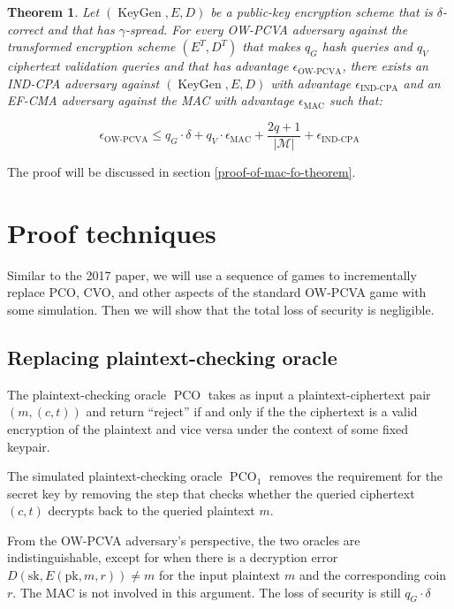 \documentclass{article}
\newcommand{\norm}[1]{\vert {#1} \vert}
\newcommand{\keygen}{\operatorname{KeyGen}}
\newtheorem{theorem}{Theorem}[section]
\begin{document}
\begin{theorem}\label{mac-fo-theorem}
    Let $(\keygen, E, D)$ be a public-key encryption scheme that is $\delta$-correct and that has $\gamma$-spread. For every OW-PCVA adversary against the transformed encryption scheme $(E^T, D^T)$ that makes $q_G$ hash queries and $q_V$ ciphertext validation queries and that has advantage $\epsilon_\text{OW-PCVA}$, there exists an IND-CPA adversary against $(\keygen, E, D)$ with advantage $\epsilon_\text{IND-CPA}$ and an EF-CMA adversary against the MAC with advantage $\epsilon_\text{MAC}$ such that:

    \begin{equation*}
        \epsilon_\text{OW-PCVA}
        \leq q_G \cdot \delta 
        + q_V \cdot \epsilon_\text{MAC}
        + \frac{2q+1}{\norm{\mathcal{M}}} 
        + \epsilon_\text{IND-CPA}
    \end{equation*}
\end{theorem}

The proof will be discussed in section \ref{proof-of-mac-fo-theorem}.

\section{Proof techniques}
Similar to the 2017 paper, we will use a sequence of games to incrementally replace PCO, CVO, and other aspects of the standard OW-PCVA game with some simulation. Then we will show that the total loss of security is negligible.

\subsection{Replacing plaintext-checking oracle}\label{replacing-pco}
The plaintext-checking oracle $\operatorname{PCO}$ takes as input a plaintext-ciphertext pair $(m, (c, t))$ and return ``reject'' if and only if the the ciphertext is a valid encryption of the plaintext and vice versa under the context of some fixed keypair.

The simulated plaintext-checking oracle $\operatorname{PCO}_1$ removes the requirement for the secret key by removing the step that checks whether the queried ciphertext $(c, t)$ decrypts back to the queried plaintext $m$.

From the OW-PCVA adversary's perspective, the two oracles are indistinguishable, except for when there is a decryption error $D(\text{sk}, E(\text{pk}, m, r)) \neq m$ for the input plaintext $m$ and the corresponding coin $r$. The MAC is not involved in this argument. The loss of security is still $q_G\cdot\delta$
\end{document}
